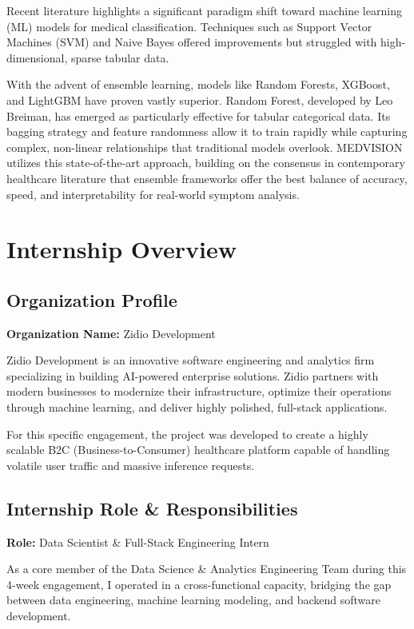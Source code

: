 \documentclass[12pt,a4paper]{report}
\begin{document}
Recent literature highlights a significant paradigm shift toward machine learning (ML) models for medical classification. Techniques such as Support Vector Machines (SVM) and Naive Bayes offered improvements but struggled with high-dimensional, sparse tabular data. 

With the advent of ensemble learning, models like Random Forests, XGBoost, and LightGBM have proven vastly superior. Random Forest, developed by Leo Breiman, has emerged as particularly effective for tabular categorical data. Its bagging strategy and feature randomness allow it to train rapidly while capturing complex, non-linear relationships that traditional models overlook. MEDVISION utilizes this state-of-the-art approach, building on the consensus in contemporary healthcare literature that ensemble frameworks offer the best balance of accuracy, speed, and interpretability for real-world symptom analysis.

\chapter{Internship Overview}

\section{Organization Profile}
\textbf{Organization Name:} Zidio Development 

Zidio Development is an innovative software engineering and analytics firm specializing in building AI-powered enterprise solutions. Zidio partners with modern businesses to modernize their infrastructure, optimize their operations through machine learning, and deliver highly polished, full-stack applications. 

For this specific engagement, the project was developed to create a highly scalable B2C (Business-to-Consumer) healthcare platform capable of handling volatile user traffic and massive inference requests.

\section{Internship Role \& Responsibilities}
\textbf{Role:} Data Scientist \& Full-Stack Engineering Intern

As a core member of the Data Science \& Analytics Engineering Team during this 4-week engagement, I operated in a cross-functional capacity, bridging the gap between data engineering, machine learning modeling, and backend software development. 
\end{document}
